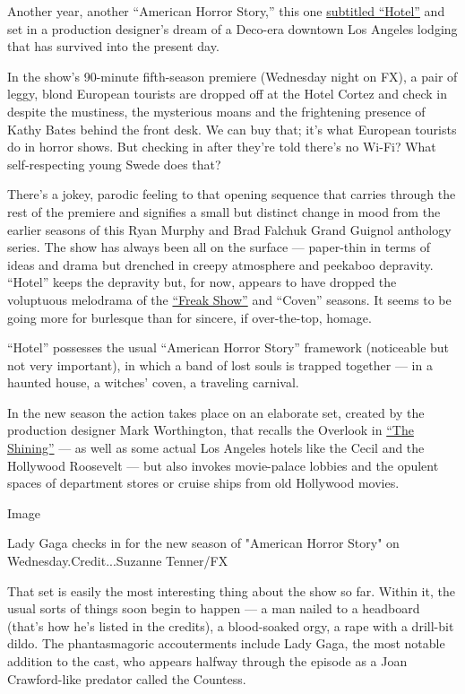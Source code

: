 Another year, another ``American Horror Story,'' this one
\href{http://www.fxnetworks.com/shows/american-horror-story/episodes}{subtitled
``Hotel''} and set in a production designer's dream of a Deco-era
downtown Los Angeles lodging that has survived into the present day.

In the show's 90-minute fifth-season premiere (Wednesday night on FX), a
pair of leggy, blond European tourists are dropped off at the Hotel
Cortez and check in despite the mustiness, the mysterious moans and the
frightening presence of Kathy Bates behind the front desk. We can buy
that; it's what European tourists do in horror shows. But checking in
after they're told there's no Wi-Fi? What self-respecting young Swede
does that?

There's a jokey, parodic feeling to that opening sequence that carries
through the rest of the premiere and signifies a small but distinct
change in mood from the earlier seasons of this Ryan Murphy and Brad
Falchuk Grand Guignol anthology series. The show has always been all on
the surface --- paper-thin in terms of ideas and drama but drenched in
creepy atmosphere and peekaboo depravity. ``Hotel'' keeps the depravity
but, for now, appears to have dropped the voluptuous melodrama of the
\href{http://www.nytimes.com/2014/10/08/arts/television/american-horror-story-freak-show-begins-wednesday.html}{``Freak
Show''} and ``Coven'' seasons. It seems to be going more for burlesque
than for sincere, if over-the-top, homage.

``Hotel'' possesses the usual ``American Horror Story'' framework
(noticeable but not very important), in which a band of lost souls is
trapped together --- in a haunted house, a witches' coven, a traveling
carnival.

In the new season the action takes place on an elaborate set, created by
the production designer Mark Worthington, that recalls the Overlook in
\href{https://www.youtube.com/watch?v=5Cb3ik6zP2I}{``The Shining''} ---
as well as some actual Los Angeles hotels like the Cecil and the
Hollywood Roosevelt --- but also invokes movie-palace lobbies and the
opulent spaces of department stores or cruise ships from old Hollywood
movies.

Image

Lady Gaga checks in for the new season of "American Horror Story" on
Wednesday.Credit...Suzanne Tenner/FX

That set is easily the most interesting thing about the show so far.
Within it, the usual sorts of things soon begin to happen --- a man
nailed to a headboard (that's how he's listed in the credits), a
blood-soaked orgy, a rape with a drill-bit dildo. The phantasmagoric
accouterments include Lady Gaga, the most notable addition to the cast,
who appears halfway through the episode as a Joan Crawford-like predator
called the Countess.

